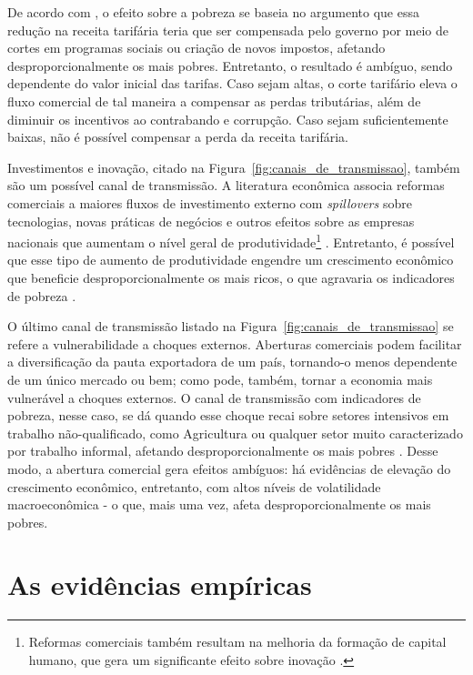 De acordo com \textcite{bannisterthugge01}, o efeito sobre a pobreza se baseia no argumento que essa redução na receita tarifária teria que ser compensada pelo governo por meio de cortes em programas sociais ou criação de novos impostos, afetando desproporcionalmente os mais pobres. Entretanto, o resultado é ambíguo, sendo dependente do valor inicial das tarifas. Caso sejam altas, o corte tarifário eleva o fluxo comercial de tal maneira a compensar as perdas tributárias, além de diminuir os incentivos ao contrabando e corrupção. Caso sejam suficientemente baixas, não é possível compensar a perda da receita tarifária.

Investimentos e inovação, citado na Figura~\ref{fig:canais_de_transmissao}, também são um possível canal de transmissão. A literatura econômica associa reformas comerciais a maiores fluxos de investimento externo com \textit{spillovers} sobre tecnologias, novas práticas de negócios e outros efeitos sobre as empresas nacionais que aumentam o nível geral de produtividade\footnote{Reformas comerciais também resultam na melhoria da formação de capital humano, que gera um significante efeito sobre inovação \cite{bannisterthugge01}.} \cite{bannisterthugge01}. Entretanto, é possível que esse tipo de aumento de produtividade engendre um crescimento econômico que beneficie desproporcionalmente os mais ricos, o que agravaria os indicadores de pobreza \cite{lundberg03}.

O último canal de transmissão listado na Figura~\ref{fig:canais_de_transmissao} se refere a vulnerabilidade a choques externos. Aberturas comerciais podem facilitar a diversificação da pauta exportadora de um país, tornando-o menos dependente de um único mercado ou bem; como pode, também, tornar a economia mais vulnerável a choques externos. O canal de transmissão com indicadores de pobreza, nesse caso, se dá quando esse choque recai sobre setores intensivos em trabalho não-qualificado, como Agricultura ou qualquer setor muito caracterizado por trabalho informal, afetando desproporcionalmente os mais pobres \cite{bannisterthugge01}. Desse modo, a abertura comercial gera efeitos ambíguos: há evidências de elevação do crescimento econômico, entretanto, com altos níveis de volatilidade macroeconômica - o que, mais uma vez, afeta desproporcionalmente os mais pobres.



\section{As evidências empíricas} \label{sec:evidencias_empiricas}

